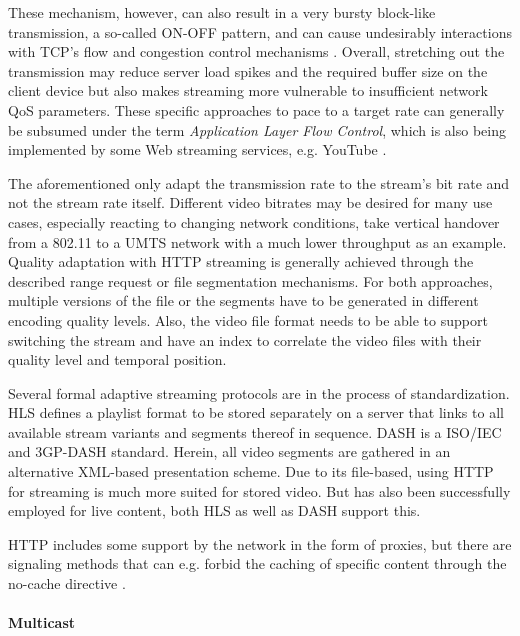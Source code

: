 These mechanism, however, can also result in a very bursty block-like transmission, a so-called ON-OFF pattern, and can cause undesirably interactions with \gls{TCP}'s flow and congestion control mechanisms . Overall, stretching out the transmission may reduce server load spikes and the required buffer size on the client device but also makes streaming more vulnerable to insufficient network \gls{QoS} parameters. These specific approaches to pace to a target rate can generally be subsumed under the term \textit{Application Layer Flow Control}, which is also being implemented by some Web streaming services, e.g. YouTube \cite{alcock2011afcyt,metzger2011delivery}.

The aforementioned only adapt the transmission rate to the stream's bit rate and not the stream rate itself. Different video bitrates may be desired for many use cases, especially reacting to changing network conditions, take vertical handover from a 802.11 to a \gls{UMTS} network with a much lower throughput as an example. Quality adaptation with \gls{HTTP} streaming is generally achieved through the described range request or file segmentation mechanisms. For both approaches, multiple versions of the file or the segments have to be generated in different encoding quality levels. Also, the video file format needs to be able to support switching the stream and have an index to correlate the video files with their quality level and temporal position. \cite{ma2011mobile, watching-video1}

Several formal adaptive streaming protocols are in the process of standardization. \gls{HLS} \cite{pantos2011livestreaming} defines a playlist format to be stored separately on a server that links to all available stream variants and segments thereof in sequence. \gls{DASH} \cite{Stockhammer:2011:DAS:1943552.1943572} is a \gls{ISO}/\gls{IEC} \cite{iso-iec-23009-1} and 3GP-DASH \cite{3gpp.26.247} standard. Herein, all video segments are gathered in an alternative XML-based presentation scheme. Due to its file-based, using \gls{HTTP} for streaming is much more suited for stored video. But has also been successfully employed for live content, both \gls{HLS} as well as \gls{DASH} support this.


HTTP includes some support by the network in the form of proxies, but there are signaling methods that can e.g. forbid the caching of specific content through the no-cache directive \cite{rfc2616}.



\paragraph{Multicast}

